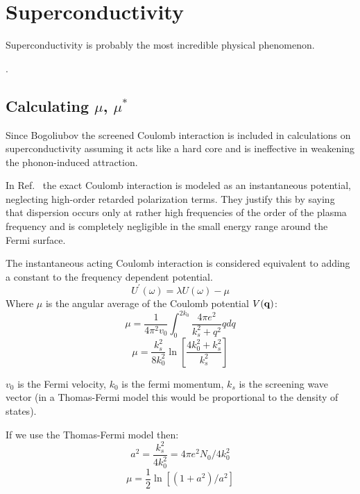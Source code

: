 \chapter{Superconductivity}
\label{chap:superconductivity}
Superconductivity is probably the most incredible physical phenomenon. 

\cite{little64}.

\section{Calculating $\mu$, $\mu^{*}$}
Since Bogoliubov the screened Coulomb interaction is included in calculations on 
superconductivity assuming it acts like a hard core and 
is ineffective in weakening the phonon-induced attraction.

In Ref.~\cite{morel62} the exact Coulomb interaction is modeled 
as an instantaneous potential, neglecting high-order retarded polarization terms. 
They justify this by saying that dispersion occurs only at rather
high frequencies of the order of the plasma frequency 
and is completely negligible in the small energy range around the Fermi surface.

The instantaneous acting Coulomb interaction is considered 
equivalent to adding a constant to the frequency dependent potential.
%
\begin{equation}
U^{'}(\omega) = \lambda U(\omega) - \mu
\end{equation}
%
Where $\mu$ is the angular average of the Coulomb potential $V({\bf q})$:
%
\begin{equation}
\mu=\frac{1}{4\pi^{2}v_{0}}\int_{0}^{2k_{0}}\frac{4\pi e^{2}}{k_{s}^{2}+q^{2}}qdq
\end{equation}
%
\begin{equation}
\mu=\frac{k_{s}^{2}}{8k_{0}^{2}}\ln\left[\frac{4k_{0}^{2}+k_{s}^{2}}{k_{s}^{2}}\right]
\end{equation}

$v_{0}$ is the Fermi velocity, $k_{0}$ is the fermi momentum, $k_{s}$ is the screening
wave vector (in a Thomas-Fermi model this would be proportional to the density of states).

If we use the Thomas-Fermi model then: 
%
\begin{equation}
a^{2} = \frac{k^{2}_{s}}{4k^{2}_{0}} = 4\pi e^{2} N_{0}/4k^{2}_{0}
\end{equation}
%
\begin{equation}
\mu = \frac{1}{2} \ln \left[(1+a^{2})/a^{2}\right]
\end{equation}

